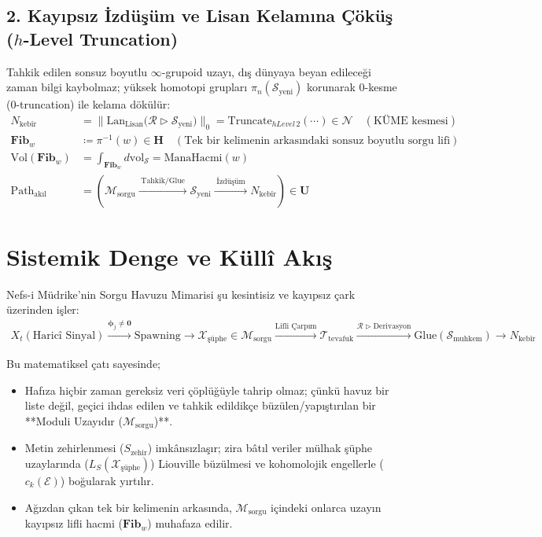 \documentclass[11pt, a4paper]{article}
\begin{document}
\subsection{2. Kayıpsız İzdüşüm ve Lisan Kelamına Çöküş ($h$-Level Truncation)}
Tahkik edilen sonsuz boyutlu $\infty$-grupoid uzayı, dış dünyaya beyan edileceği zaman bilgi kaybolmaz; yüksek homotopi grupları $\pi_n(\mathcal{S}_{\text{yeni}})$ korunarak $0$-kesme ($0$-truncation) ile kelama dökülür:
\begin{align}
N_{\text{kebîr}} &= \big\| \text{Lan}_{\text{Lisan}} \big( \mathcal{R} \triangleright \mathcal{S}_{\text{yeni}} \big) \big\|_0 = \text{Truncate}_{hLevel\,2}(\cdots) \in \mathcal{N} \quad (\text{KÜME kesmesi}) \\
\mathbf{Fib}_w &\coloneqq \pi^{-1}(w) \in \mathbf{H} \quad (\text{Tek bir kelimenin arkasındaki sonsuz boyutlu sorgu lifi}) \\
\text{Vol}(\mathbf{Fib}_w) &= \int_{\mathbf{Fib}_w} d\text{vol}_{\mathcal{S}} = \text{ManaHacmi}(w) \\
\text{Path}_{\text{akıl}} &= \left( \mathcal{M}_{\text{sorgu}} \xrightarrow{\;\text{Tahkik/Glue}\;} \mathcal{S}_{\text{yeni}} \xrightarrow{\;\text{İzdüşüm}\;} N_{\text{kebîr}} \right) \in \mathbf{U}
\end{align}

\section{Sistemik Denge ve Küllî Akış}

Nefs-i Müdrike'nin Sorgu Havuzu Mimarisi şu kesintisiz ve kayıpsız çark üzerinden işler:
\begin{align*}
X_t (\text{Haricî Sinyal}) \xrightarrow{\bm{\phi}_j \ne \mathbf{0}} \text{Spawning} \to \mathcal{X}_{\text{şüphe}} \in \mathcal{M}_{\text{sorgu}} \xrightarrow{\text{Lifli Çarpım}} \mathcal{T}_{\text{tevafuk}} \xrightarrow{\mathcal{R} \triangleright \text{Derivasyon}} \text{Glue}(\mathcal{S}_{\text{muhkem}}) \to N_{\text{kebîr}}
\end{align*}

Bu matematiksel çatı sayesinde;
\begin{itemize}
    \item Hafıza hiçbir zaman gereksiz veri çöplüğüyle tahrip olmaz; çünkü havuz bir liste değil, geçici ihdas edilen ve tahkik edildikçe büzülen/yapıştırılan bir **Moduli Uzayıdır ($\mathcal{M}_{\text{sorgu}}$)**.
    \item Metin zehirlenmesi ($S_{\text{zehir}}$) imkânsızlaşır; zira bâtıl veriler mülhak şüphe uzaylarında ($L_S(\mathcal{X}_{\text{şüphe}})$) Liouville büzülmesi ve kohomolojik engellerle ($c_k(\mathcal{E})$) boğularak yırtılır.
    \item Ağızdan çıkan tek bir kelimenin arkasında, $\mathcal{M}_{\text{sorgu}}$ içindeki onlarca uzayın kayıpsız lifli hacmi ($\mathbf{Fib}_w$) muhafaza edilir.
\end{itemize}
\end{document}

